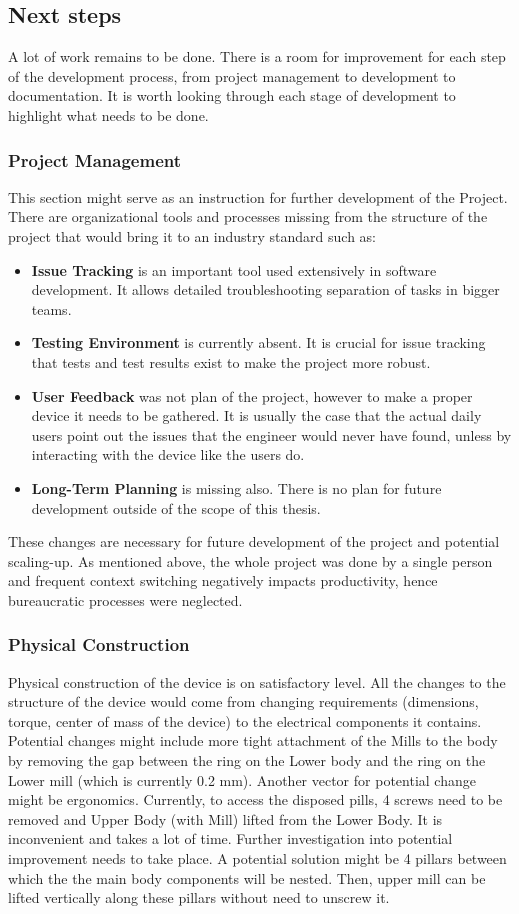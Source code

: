 \subsection{Next steps}
A lot of work remains to be done. There is a room for improvement for each step of the development process, from project management to development to documentation. It is worth looking through each stage of development to highlight what needs to be done.
\subsubsection{Project Management}
This section might serve as an instruction for further development of the Project. There are organizational tools and processes missing from the structure of the project that would bring it to an industry standard such as:
\begin{itemize}
	\item \textbf{Issue Tracking} is an important tool used extensively in software development. It allows detailed troubleshooting separation of tasks in bigger teams.
	\item \textbf{Testing Environment} is currently absent. It is crucial for issue tracking that tests and test results exist to make the project more robust. 
	\item \textbf{User Feedback} was not plan of the project, however to make a proper device it needs to be gathered. It is usually the case that the actual daily users point out the issues that the engineer would never have found, unless by interacting with the device like the users do.
	\item \textbf{Long-Term Planning} is missing also. There is no plan for future development outside of the scope of this thesis.
\end{itemize}
These changes are necessary for future development of the project and potential scaling-up. As mentioned above, the whole project was done by a single person and frequent context switching negatively impacts productivity, hence bureaucratic processes were neglected.

\subsubsection{Physical Construction}
Physical construction of the device is on satisfactory level. All the changes to the structure of the device would come from changing requirements (dimensions, torque, center of mass of the device) to the electrical components it contains. Potential changes might include more tight attachment of the Mills to the body by removing the gap between the ring on the Lower body and the ring on the Lower mill (which is currently 0.2 mm). Another vector for potential change might be ergonomics. Currently, to access the disposed pills, 4 screws need to be removed and Upper Body (with Mill) lifted from the Lower Body. It is inconvenient and takes a lot of time. Further investigation into potential improvement needs to take place. A potential solution might be 4 pillars between which the the main body components will be nested. Then, upper mill can be lifted vertically along these pillars without need to unscrew it.

